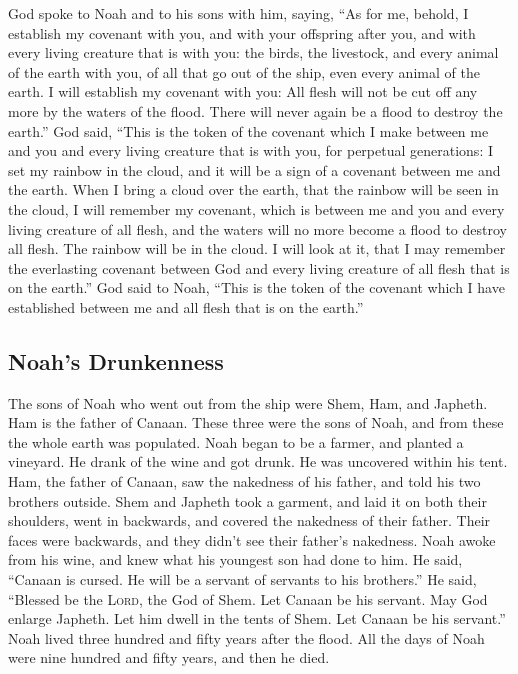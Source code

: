  God spoke to Noah and to his sons with him, saying,
 ``As for me, behold, I establish my covenant with you,
and with your offspring after you,  and with every living
creature that is with you: the birds, the livestock, and every animal of
the earth with you, of all that go out of the ship, even every animal of
the earth.  I will establish my covenant with you: All
flesh will not be cut off any more by the waters of the flood. There
will never again be a flood to destroy the earth.''  God
said, ``This is the token of the covenant which I make between me and
you and every living creature that is with you, for perpetual
generations:  I set my rainbow in the cloud, and it will
be a sign of a covenant between me and the earth.  When I
bring a cloud over the earth, that the rainbow will be seen in the
cloud,  I will remember my covenant, which is between me
and you and every living creature of all flesh, and the waters will no
more become a flood to destroy all flesh.  The rainbow
will be in the cloud. I will look at it, that I may remember the
everlasting covenant between God and every living creature of all flesh
that is on the earth.''  God said to Noah, ``This is the
token of the covenant which I have established between me and all flesh
that is on the earth.''

\hypertarget{noahs-drunkenness}{%
\subsection{Noah's Drunkenness}\label{noahs-drunkenness}}

 The sons of Noah who went out from the ship were Shem,
Ham, and Japheth. Ham is the father of Canaan.  These
three were the sons of Noah, and from these the whole earth was
populated.  Noah began to be a farmer, and planted a
vineyard.  He drank of the wine and got drunk. He was
uncovered within his tent.  Ham, the father of Canaan,
saw the nakedness of his father, and told his two brothers outside.
 Shem and Japheth took a garment, and laid it on both
their shoulders, went in backwards, and covered the nakedness of their
father. Their faces were backwards, and they didn't see their father's
nakedness.  Noah awoke from his wine, and knew what his
youngest son had done to him.  He said, ``Canaan is
cursed. He will be a servant of servants to his brothers.''
 He said, ``Blessed be the \textsc{Lord}, the God of
Shem. Let Canaan be his servant.  May God enlarge
Japheth. Let him dwell in the tents of Shem. Let Canaan be his
servant.''  Noah lived three hundred and fifty years
after the flood.  All the days of Noah were nine hundred
and fifty years, and then he died.

